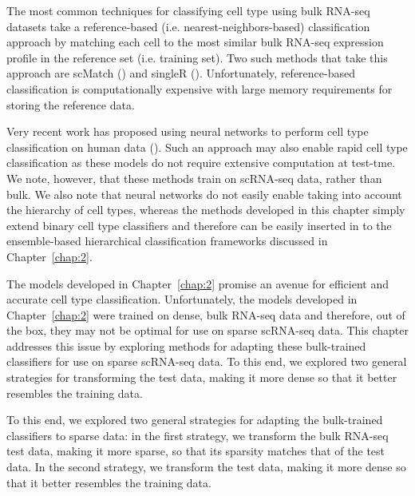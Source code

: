 The most common techniques for classifying cell type using bulk RNA-seq datasets take a reference-based (i.e. nearest-neighbors-based) classification approach by matching each cell to the most similar bulk RNA-seq expression profile in the reference set (i.e. training set).  Two such methods that take this approach are scMatch (\citealp{Hou2019}) and singleR (\citealp{Aran2019}).  Unfortunately, reference-based classification is computationally expensive with large memory requirements for storing the reference data.  

Very recent work has proposed using neural networks to perform cell type classification on human data (\citealp{Xie2019, Ma2019}). Such an approach may also enable rapid cell type classification as these models do not require extensive computation at test-tme. We note, however, that these methods train on scRNA-seq data, rather than bulk. We also note that neural networks do not easily enable taking into account the hierarchy of cell types, whereas the methods developed in this chapter simply extend binary cell type classifiers and therefore can be easily inserted in to the ensemble-based hierarchical classification frameworks discussed in Chapter~\ref{chap:2}.  

The models developed in Chapter~\ref{chap:2} promise an avenue for efficient and accurate cell type classification. Unfortunately, the models developed in Chapter~\ref{chap:2} were trained on dense, bulk RNA-seq data and therefore, out of the box, they may not be optimal for use on sparse scRNA-seq data.  This chapter addresses this issue by exploring methods for adapting these bulk-trained classifiers for use on sparse scRNA-seq data. To this end, we explored two general strategies for transforming the test data, making it more dense so that it better resembles the training data.  

To this end, we explored two general strategies for adapting the bulk-trained classifiers to sparse data: in the first strategy, we transform the bulk RNA-seq test data, making it more sparse, so that its sparsity matches that of the test data. In the second strategy, we transform the test data, making it more dense so that it better resembles the training data.  



